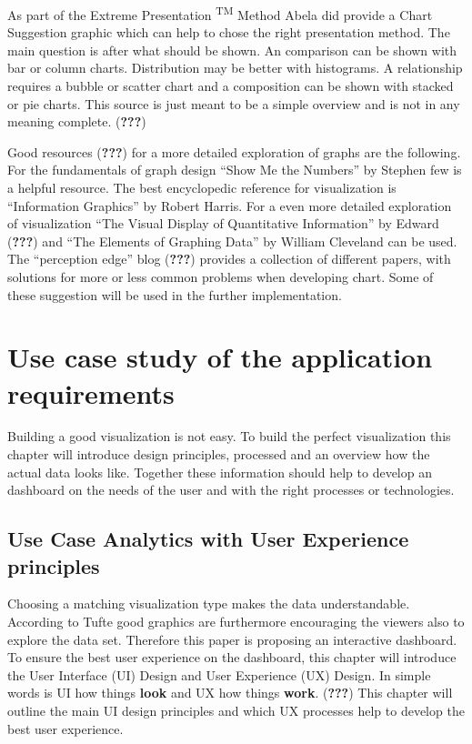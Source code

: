 \documentclass[american,a4paper,oneside,,tablecaptionabove]{scrbook}
\begin{document}
As part of the Extreme Presentation \textsuperscript{TM} Method Abela
did provide a Chart Suggestion graphic which can help to chose the right
presentation method. The main question is after what should be shown. An
comparison can be shown with bar or column charts. Distribution may be
better with histograms. A relationship requires a bubble or scatter
chart and a composition can be shown with stacked or pie charts. This
source is just meant to be a simple overview and is not in any meaning
complete. ({\textbf{???}})

Good resources ({\textbf{???}}) for a more detailed exploration of
graphs are the following. For the fundamentals of graph design
\enquote{Show Me the Numbers} by Stephen few is a helpful resource. The
best encyclopedic reference for visualization is \enquote{Information
Graphics} by Robert Harris. For a even more detailed exploration of
visualization \enquote{The Visual Display of Quantitative Information}
by Edward ({\textbf{???}}) and \enquote{The Elements of Graphing Data}
by William Cleveland can be used.\\
The \enquote{perception edge} blog ({\textbf{???}}) provides a
collection of different papers, with solutions for more or less common
problems when developing chart. Some of these suggestion will be used in
the further implementation.

\chapter{Use case study of the application
requirements}\label{use-case-study-of-the-application-requirements}

Building a good visualization is not easy. To build the perfect
visualization this chapter will introduce design principles, processed
and an overview how the actual data looks like. Together these
information should help to develop an dashboard on the needs of the user
and with the right processes or technologies.

\section{Use Case Analytics with User Experience
principles}\label{use-case-analytics-with-user-experience-principles}

Choosing a matching visualization type makes the data understandable.
According to Tufte good graphics are furthermore encouraging the viewers
also to explore the data set. Therefore this paper is proposing an
interactive dashboard. To ensure the best user experience on the
dashboard, this chapter will introduce the User Interface (UI) Design
and User Experience (UX) Design. In simple words is UI how things
\textbf{look} and UX how things \textbf{work}. ({\textbf{???}}) This
chapter will outline the main UI design principles and which UX
processes help to develop the best user experience.
\end{document}
